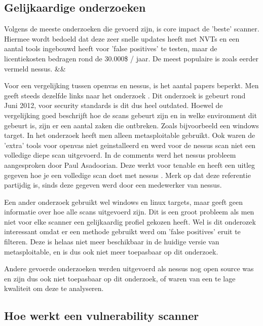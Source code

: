 \subsection{Gelijkaardige onderzoeken}

Volgens de meeste onderzoeken die gevoerd zijn, is core impact de 'beste' scanner. Hiermee wordt bedoeld dat deze zeer snelle updates heeft met NVTs en een aantal tools ingebouwd heeft voor 'false positives' te testen, maar de licentiekosten bedragen rond de 30.000\$ / jaar. De meest populaire is zoals eerder vermeld nessus. \textcite{Concise} \&\& \textcite{Sectools} 

Voor een vergelijking tussen openvas en nessus, is het aantal papers beperkt. Men geeft steeds dezelfde links naar het onderzoek \textcite{Hackertarget}. Dit onderzoek is gebeurt rond Juni 2012, voor security standards is dit dus heel outdated. Hoewel de vergelijking goed beschrijft hoe de scans gebeurt zijn en in welke environment dit gebeurt is, zijn er een aantal zaken die ontbreken. Zoals bijvoorbeeld een windows target. In het onderzoek heeft men alleen metasploitable gebruikt. Ook waren de 'extra' tools voor openvas niet geinstalleerd en werd voor de nessus scan niet een volledige diepe scan uitgevoerd. In de comments werd het nessus probleem aangesproken door Paul Asadoorian. Deze werkt voor tenable en heeft een uitleg gegeven hoe je een volledige scan doet met nessus \textcite{Securityweekly}. Merk op dat deze referentie partijdig is, sinds deze gegeven werd door een medewerker van nessus.

Een ander onderzoek \textcite{Rageweb} gebruikt wel windows en linux targets, maar geeft geen informatie over hoe alle scans uitgevoerd zijn. Dit is een groot probleem als men niet voor elke scanner een gelijkaardig profiel gekozen heeft. Wel is dit onderozek interessant omdat er een methode gebruikt werd om 'false positives' eruit te filteren. Deze is helaas niet meer beschikbaar in de huidige versie van metasploitable, en is dus ook niet meer toepasbaar op dit onderzoek.

Andere gevoerde onderzoeken werden uitgevoerd als nessus nog open source was en zijn dus ook niet toepasbaar op dit onderzoek, of waren van een te lage kwaliteit om deze te analyseren. 

\subsection{Hoe werkt een vulnerability scanner}

